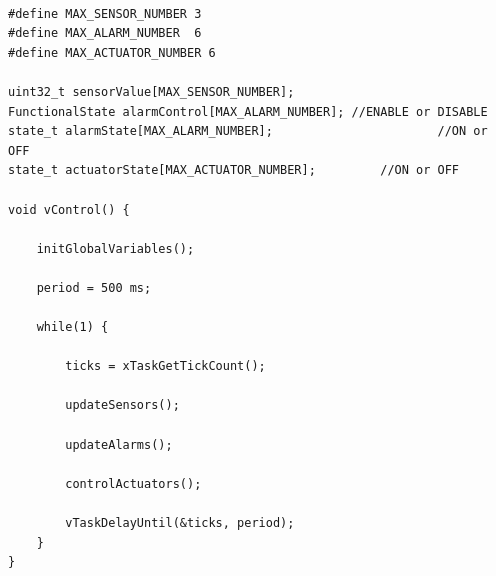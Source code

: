 \begin{lstlisting}[caption=Pseudocódigo del lazo principal de control.]  % Start your code-block

#define MAX_SENSOR_NUMBER 3
#define MAX_ALARM_NUMBER  6
#define MAX_ACTUATOR_NUMBER 6

uint32_t sensorValue[MAX_SENSOR_NUMBER];		
FunctionalState alarmControl[MAX_ALARM_NUMBER];	//ENABLE or DISABLE
state_t alarmState[MAX_ALARM_NUMBER];						//ON or OFF
state_t actuatorState[MAX_ACTUATOR_NUMBER];			//ON or OFF

void vControl() {

	initGlobalVariables();
	
	period = 500 ms;
		
	while(1) {

		ticks = xTaskGetTickCount();
		
		updateSensors();
		
		updateAlarms();
		
		controlActuators();
		
		vTaskDelayUntil(&ticks, period);
	}
}
\end{lstlisting}



